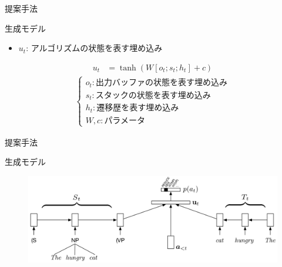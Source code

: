 \documentclass[aspectratio=43,unicode,10pt]{beamer}
\begin{document}
\begin{frame}{提案手法}
  \begin{block}{生成モデル}
    \begin{itemize}
      \item $u_t$: アルゴリズムの状態を表す埋め込み
    \end{itemize}
    \begin{align*}
      u_t & = \tanh (W[o_t; s_t; h_t] + c)
    \end{align*}
    \begin{gather*}
      \begin{cases}
        o_t: \text{出力バッファの状態を表す埋め込み} \\
        s_t: \text{スタックの状態を表す埋め込み} \\
        h_t: \text{遷移歴を表す埋め込み} \\
        W, c: \text{パラメータ}
      \end{cases}
    \end{gather*}
  \end{block}
\end{frame}

\begin{frame}{提案手法}
  \begin{block}{生成モデル}
    \begin{figure}
      \includegraphics[width=\textwidth]{fig/fig_5.png}
    \end{figure}
  \end{block}
\end{frame}
\end{document}
